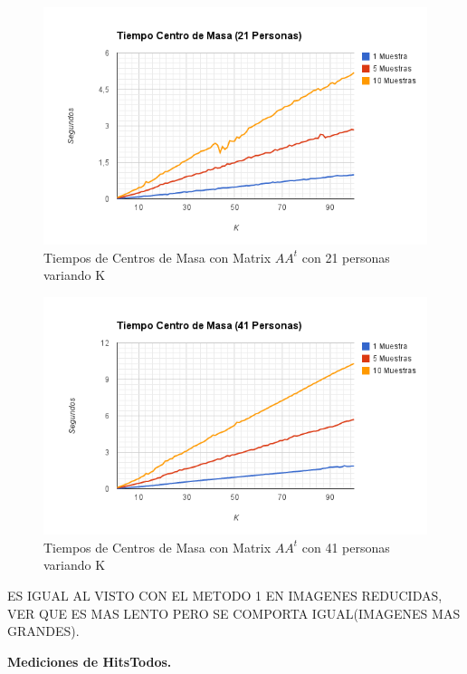 \begin{figure}[H]
\includegraphics[width=1\textwidth]{img/imagef8.png}
     \caption{Tiempos de Centros de Masa con Matrix $AA^t$ con 21 personas variando K}
\end{figure}

\begin{figure}[H]
\includegraphics[width=1\textwidth]{img/imagef9.png}
     \caption{Tiempos de Centros de Masa con Matrix $AA^t$ con 41 personas variando K}
\end{figure}

ES IGUAL AL VISTO CON EL METODO 1 EN IMAGENES REDUCIDAS, VER QUE ES MAS LENTO PERO SE COMPORTA IGUAL(IMAGENES MAS GRANDES).

\textbf{Mediciones de HitsTodos. }


